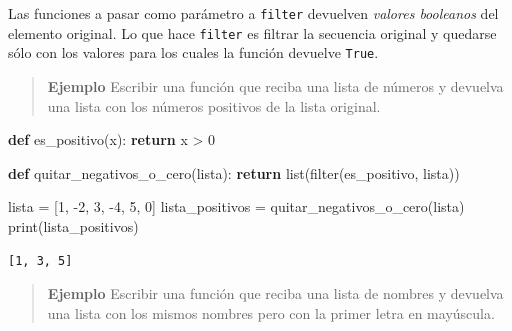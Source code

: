 \documentclass[
  letterpaper,
  DIV=11,
  numbers=noendperiod]{scrreprt}
\newenvironment{Shaded}{\begin{snugshade}}{\end{snugshade}}
\newcommand{\BuiltInTok}[1]{\textcolor[rgb]{0.00,0.23,0.31}{#1}}
\newcommand{\ControlFlowTok}[1]{\textcolor[rgb]{0.00,0.23,0.31}{\textbf{#1}}}
\newcommand{\DecValTok}[1]{\textcolor[rgb]{0.68,0.00,0.00}{#1}}
\newcommand{\KeywordTok}[1]{\textcolor[rgb]{0.00,0.23,0.31}{\textbf{#1}}}
\newcommand{\NormalTok}[1]{\textcolor[rgb]{0.00,0.23,0.31}{#1}}
\newcommand{\OperatorTok}[1]{\textcolor[rgb]{0.37,0.37,0.37}{#1}}
\begin{document}
\begin{tcolorbox}[enhanced jigsaw, opacitybacktitle=0.6, toptitle=1mm, toprule=.15mm, arc=.35mm, breakable, bottomrule=.15mm, opacityback=0, leftrule=.75mm, rightrule=.15mm, title=\textcolor{quarto-callout-tip-color}{\faLightbulb}\hspace{0.5em}{Tip}, left=2mm, bottomtitle=1mm, colframe=quarto-callout-tip-color-frame, colback=white, titlerule=0mm, coltitle=black, colbacktitle=quarto-callout-tip-color!10!white]

Las funciones a pasar como parámetro a \texttt{filter} devuelven
\emph{valores booleanos} del elemento original. Lo que hace
\texttt{filter} es filtrar la secuencia original y quedarse sólo con los
valores para los cuales la función devuelve \texttt{True}.

\end{tcolorbox}

\begin{quote}
\textbf{Ejemplo} Escribir una función que reciba una lista de números y
devuelva una lista con los números positivos de la lista original.
\end{quote}

\begin{Shaded}
\begin{Highlighting}[]
\KeywordTok{def}\NormalTok{ es\_positivo(x):}
  \ControlFlowTok{return}\NormalTok{ x }\OperatorTok{\textgreater{}} \DecValTok{0}

\KeywordTok{def}\NormalTok{ quitar\_negativos\_o\_cero(lista):}
  \ControlFlowTok{return} \BuiltInTok{list}\NormalTok{(}\BuiltInTok{filter}\NormalTok{(es\_positivo, lista))}

\NormalTok{lista }\OperatorTok{=}\NormalTok{ [}\DecValTok{1}\NormalTok{, }\OperatorTok{{-}}\DecValTok{2}\NormalTok{, }\DecValTok{3}\NormalTok{, }\OperatorTok{{-}}\DecValTok{4}\NormalTok{, }\DecValTok{5}\NormalTok{, }\DecValTok{0}\NormalTok{]}
\NormalTok{lista\_positivos }\OperatorTok{=}\NormalTok{ quitar\_negativos\_o\_cero(lista)}
\BuiltInTok{print}\NormalTok{(lista\_positivos)}
\end{Highlighting}
\end{Shaded}

\begin{verbatim}
[1, 3, 5]
\end{verbatim}

\begin{quote}
\textbf{Ejemplo} Escribir una función que reciba una lista de nombres y
devuelva una lista con los mismos nombres pero con la primer letra en
mayúscula.
\end{quote}
\end{document}
